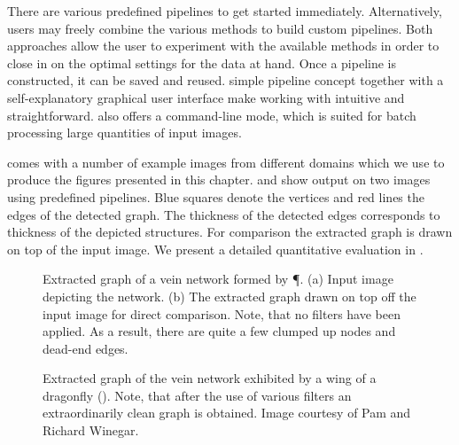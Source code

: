 	There are various predefined pipelines to get started immediately. Alternatively, users may freely combine the various methods to build custom pipelines. Both approaches allow the user to experiment with the available methods in order to close in on the optimal settings for the data at hand. Once a pipeline is constructed, it can be saved and reused. \NEFIs simple pipeline concept together with a self-explanatory graphical user interface make working with \NEFI intuitive and straightforward. \NEFI also offers a command-line mode, which is suited for batch processing large quantities of input images.

	\NEFI comes with a number of example images from different domains which we use to produce the figures presented in this chapter.  and  show \NEFIs output on two images using predefined pipelines. Blue squares denote the vertices and red lines the edges of the detected graph. The thickness of the detected edges corresponds to thickness of the depicted structures. For comparison the extracted graph is drawn on top of the input image. We present a detailed quantitative evaluation in .


	\begin{figure}
		\centering
		\qquad
		\caption[\NEFIs output - \Pp]{Extracted graph of a vein network formed by \P. (a) Input image depicting the network. (b) The extracted graph drawn on top off the input image for direct comparison. Note, that no filters have been applied. As a result, there are quite a few clumped up nodes and dead-end edges.}
		\label{fig:physarum}
	\end{figure}

	\begin{figure}
	\centering
	\caption[\NEFIs output - \Aa]{Extracted graph of the vein network exhibited by a wing of a dragonfly (\Aa). Note, that after the use of various filters an extraordinarily clean graph is obtained. Image courtesy of Pam and Richard Winegar.}
	\label{fig:dragonlfy}
	\end{figure}


